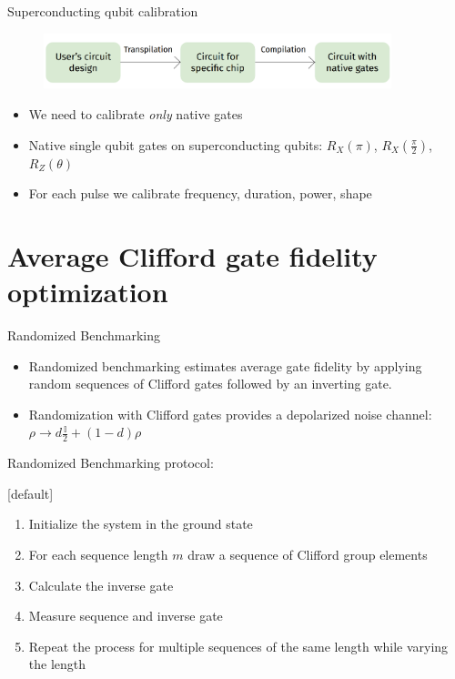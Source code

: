 \documentclass[aspectratio=169,10pt]{beamer}
\begin{document}
\begin{frame}{Superconducting qubit calibration}
  
  \begin{figure}
    \centering
    \includegraphics[width=0.9\textwidth]{figures/calibration.png}
  \end{figure}
  \vspace{1.5em}
  \begin{itemize}
    \item We need to calibrate \textit{only} native gates
    \item Native single qubit gates on superconducting qubits: $R_X(\pi)$, $R_X(\frac{\pi}{2})$, $R_Z(\theta)$
    \item For each pulse we calibrate frequency, duration, power, shape
  \end{itemize}
\end{frame}





\section{Average Clifford gate fidelity optimization}

\begin{frame}[t,fragile]{Randomized Benchmarking}

  \begin{itemize}
    \item Randomized benchmarking estimates average gate fidelity by applying random sequences of Clifford gates followed by an inverting gate.
    \item Randomization with Clifford gates provides a depolarized noise channel: $\rho \rightarrow d \frac{\mathbb{I}}{2} + (1-d)\rho$
  \end{itemize}

  \vspace{3mm}
  Randomized Benchmarking protocol:
  {[default]
   \begin{enumerate}[leftmargin=*, label=\arabic*.]
     \item Initialize the system in the ground state
     \item For each sequence length $m$ draw a sequence of Clifford group elements
     \item Calculate the inverse gate 
     \item Measure sequence and inverse gate
     \item Repeat the process for multiple sequences of the same length while varying the length
  \end{enumerate}}
\end{frame}
\end{document}
